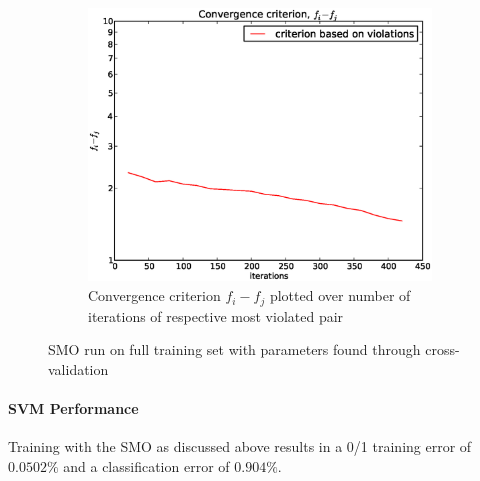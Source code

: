 \begin{figure}[!ht]
\begin{subfigure}[b]{.45\textwidth}
	\includegraphics[width=\textwidth]{svm/criterion_violations_plot.eps}
	\caption{Convergence criterion $f_i-f_j$ plotted over number of iterations of respective most violated pair}
	\label{subfig:logarithmic}
	\end{subfigure}
	\caption{SMO run on full training set with parameters found through cross-validation}
	\label{fig:criterions}
\end{figure}
\paragraph{SVM Performance}
Training with the SMO as discussed above results in a 0/1 training error of $0.0502\%$ and a classification error of $0.904\%$.

